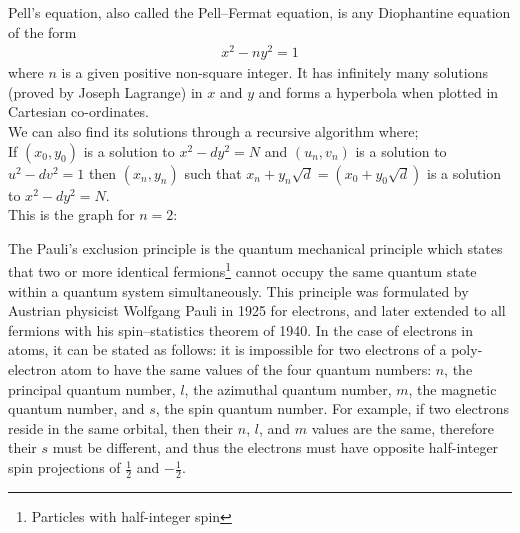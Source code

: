 \begin{mathbox}{}
{Pell's equation, also called the Pell–Fermat equation, is any Diophantine equation of the form 
\begin{align*}
x^{2}-ny^{2}=1
\end{align*}
where $n$ is a given positive non-square integer. It has infinitely many solutions (proved by Joseph Lagrange) in $x$ and $y$ and forms a hyperbola when plotted in Cartesian co-ordinates.\\
We can also find its solutions through a recursive algorithm where;\\
If $(x_{0},y_{0})$ is a solution to $x^{2}-dy^{2}=N$ and $(u_{n},v_{n})$ is a solution to $u^{2}-dv^{2}=1$ then $(x_n,y_n)$ such that $x_n+y_n \sqrt{d}=(x_{0}+y_{0}{\sqrt{d}})$ is a solution to $x^{2}-dy^{2}=N.$\\
This is the graph for $n = 2$:\\
}
\end{mathbox}
\begin{phybox}{}
{The Pauli's exclusion principle is the quantum mechanical principle which states that two or more identical fermions\footnote{Particles with half-integer spin} cannot occupy the same quantum state within a quantum system simultaneously. This principle was formulated by Austrian physicist Wolfgang Pauli in 1925 for electrons, and later extended to all fermions with his spin–statistics theorem of 1940.
In the case of electrons in atoms, it can be stated as follows: it is impossible for two electrons of a poly-electron atom to have the same values of the four quantum numbers: $n$, the principal quantum number, $l$, the azimuthal quantum number, $m$, the magnetic quantum number, and $s$, the spin quantum number. For example, if two electrons reside in the same orbital, then their $n$, $l$, and $m$ values are the same, therefore their $s$ must be different, and thus the electrons must have opposite half-integer spin projections of $\frac{1}{2}$ and $-\frac{1}{2}$.}
\end{phybox}
